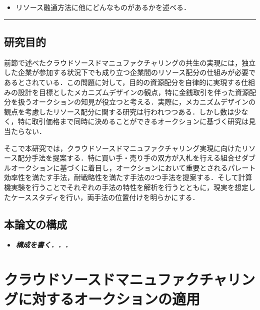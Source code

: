 \begin{itemize}
\tightlist
\item
  リソース融通方法に他にどんなものがあるかを述べる．
\end{itemize}

\begin{center}\rule{0.5\linewidth}{0.5pt}\end{center}

\hypertarget{ux7814ux7a76ux76eeux7684}{%
\section{研究目的}\label{ux7814ux7a76ux76eeux7684}}

前節で述べたクラウドソースドマニュファクチャリングの共生の実現には，独立した企業が参加する状況下でも成り立つ企業間のリソース配分の仕組みが必要であるとされている\cite{Ghomi2019}．この問題に対して，目的の資源配分を自律的に実現する仕組みの設計を目標としたメカニズムデザインの観点，特に金銭取引を伴った資源配分を扱うオークションの知見が役立つと考える．実際に，メカニズムデザインの観点を考慮したリソース配分に関する研究は行われつつある\cite{THEKINEN2017}\cite{CHIDA2019}．しかし数は少なく，特に取引価格まで同時に決めることができるオークションに基づく研究は見当たらない．

そこで本研究では，クラウドソースドマニュファクチャリング実現に向けたリソース配分手法を提案する．特に買い手・売り手の双方が入札を行える組合せダブルオークションに基づくに着目し，オークションにおいて重要とされるパレート効率性を満たす手法，耐戦略性を満たす手法の2つ手法を提案する．そして計算機実験を行うことでそれぞれの手法の特性を解析を行うとともに，現実を想定したケーススタディを行い，両手法の位置付けを明らかにする．

\hypertarget{ux672cux8ad6ux6587ux306eux69cbux6210}{%
\section{本論文の構成}\label{ux672cux8ad6ux6587ux306eux69cbux6210}}

\begin{itemize}
\tightlist
\item
  \textbf{\emph{構成を書く．．．}}
\end{itemize}

\hypertarget{ux30afux30e9ux30a6ux30c9ux30bdux30fcux30b9ux30c9ux30deux30cbux30e5ux30d5ux30a1ux30afux30c1ux30e3ux30eaux30f3ux30b0ux306bux5bfeux3059ux308bux30aaux30fcux30afux30b7ux30e7ux30f3ux306eux9069ux7528}{%
\chapter{クラウドソースドマニュファクチャリングに対するオークションの適用}\label{ux30afux30e9ux30a6ux30c9ux30bdux30fcux30b9ux30c9ux30deux30cbux30e5ux30d5ux30a1ux30afux30c1ux30e3ux30eaux30f3ux30b0ux306bux5bfeux3059ux308bux30aaux30fcux30afux30b7ux30e7ux30f3ux306eux9069ux7528}}

